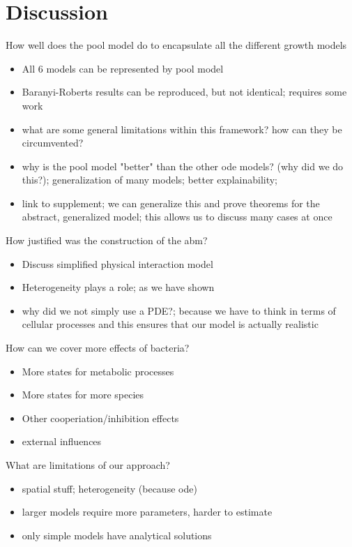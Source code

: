 \documentclass[10pt,A4paper]{article}
\numberwithin{equation}{section}
\begin{document}
\section{Discussion}

How well does the pool model do to encapsulate all the different growth models
\begin{itemize}
    \item All 6 models can be represented by pool model
    \item Baranyi-Roberts results can be reproduced, but not identical; requires some work
    \item what are some general limitations within this framework? how can they be circumvented?
    \item why is the pool model "better" than the other \ac{ode} models? (why did we do this?);
        generalization of many models; better explainability;
    \item link to supplement; we can generalize this and prove theorems for the abstract,
        generalized model; this allows us to discuss many cases at once
\end{itemize}

\noindent
How justified was the construction of the \ac{abm}?
\begin{itemize}
    \item Discuss simplified physical interaction model
    \item Heterogeneity plays a role; as we have shown
    \item why did we not simply use a PDE?; because we have to think in terms of cellular processes
        and this ensures that our model is actually realistic
\end{itemize}

\noindent
How can we cover more effects of bacteria?
\begin{itemize}
    \item More states for metabolic processes
    \item More states for more species
    \item Other cooperiation/inhibition effects
    \item external influences
\end{itemize}

\noindent
What are limitations of our approach?
\begin{itemize}
    \item spatial stuff; heterogeneity (because \ac{ode})
    \item larger models require more parameters, harder to estimate
    \item only simple models have analytical solutions
\end{itemize}
\end{document}

